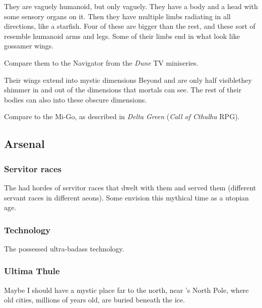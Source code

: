 They are vaguely humanoid, but only vaguely.
They have a body and a head with some sensory organs on it. Then they have multiple limbs radiating in all directions, like a starfish. Four of these are bigger than the rest, and these sort of resemble humanoid arms and legs. Some of their limbs end in what look like gossamer wings.

Compare them to the Navigator from the \emph{Dune} TV miniseries.

Their wings extend into mystic dimensions Beyond and are only half visible\dash they shimmer in and out of the dimensions that mortals can see. 
The rest of their bodies can also  into these obscure dimensions. 

Compare to the Mi-Go, as described in \emph{Delta Green} (\emph{Call of Cthulhu} RPG). 









\subsection{Arsenal}





\subsubsection{Servitor races}
The \voyagers{} had hordes of servitor races that dwelt with them and served them (different servant races in different aeons). Some envision this mythical time as a utopian age. 





\subsubsection{Technology}
The \voyagers{} possessed ultra-badass technology.





\subsubsection{Ultima Thule}
Maybe I should have a mystic place far to the north, near \Miith{}'s North Pole, where old \voyager{} cities, millions of years old, are buried beneath the ice. 

